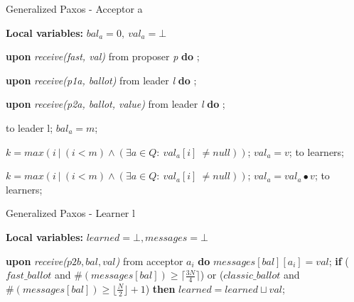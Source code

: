 \begin{algorithm}
	\caption{Generalized Paxos - Acceptor a}
	\textbf{Local variables: } $bal_a = 0,\ val_a = \bot$ 
	\begin{algorithmic}[1]
		
		\State \textbf{upon} \textit{receive(fast, val)} from proposer \textit{p} \textbf{do}
		\State \hspace{\algorithmicindent} ;
		
		\State
		\State \textbf{upon} \textit{receive(p1a, ballot)} from leader \textit{l} \textbf{do}
		\State \hspace{\algorithmicindent} ;
		
		\State
		\State \textbf{upon} \textit{receive(p2a, ballot, value)} from leader \textit{l} \textbf{do}
		\State \hspace{\algorithmicindent} ;
		
		\State
		\State {} to leader l;
		\State $bal_a = m$;
		\EndIf
		\EndFunction
		
		\State
		\State $k = max(i\ |\ (i < m) \wedge (\exists a \in Q :\ val_a[i]\ \neq null))$;
		\State $val_a = v$;
		\State {} to learners;
		\EndIf
		\EndFunction
		
		\State
		\State $k = max(i\ |\ (i < m) \wedge (\exists a \in Q :\ val_a[i]\ \neq null))$;
		\State $val_a = val_a \bullet v$;
		\State {} to learners;
		\EndIf
		\EndFunction
		
	\end{algorithmic}
\end{algorithm}

\begin{algorithm}
	\caption{Generalized Paxos - Learner l}
	\textbf{Local variables: } $learned = \bot, messages = \bot$ 
	\begin{algorithmic}[1]
		\State \textbf{upon} \textit{receive($p2b, bal, val$)} from acceptor $a_i$ \textbf{do}
		\State \hspace{\algorithmicindent} $messages[bal][a_i] = val$;
		\State \hspace{\algorithmicindent} \textbf{if} {($fast\_ballot$ and $\#(messages[bal]) \geq \lceil \frac{3N}{4} \rceil$) or
			\State \hspace{\algorithmicindent} \hspace{\algorithmicindent}	($classic\_ballot$ and $\#(messages[bal]) \geq \lfloor \frac{N}{2}\rfloor+1$)} \textbf{then}
		\State \hspace{\algorithmicindent} \hspace{\algorithmicindent} \hspace{\algorithmicindent} $learned = learned \sqcup val$;
	\end{algorithmic}
\end{algorithm}
